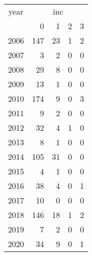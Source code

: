 \footnotesize\begin{tabular}[t]{lrrrr}
\toprule
\multicolumn{1}{c}{year} & \multicolumn{4}{c}{inc} \\
\cmidrule(l{3pt}r{3pt}){1-1} \cmidrule(l{3pt}r{3pt}){2-5}
  & 0 & 1 & 2 & 3\\
\midrule
2006 & 147 & 23 & 1 & 2\\
2007 & 3 & 2 & 0 & 0\\
2008 & 29 & 8 & 0 & 0\\
2009 & 13 & 1 & 0 & 0\\
2010 & 174 & 9 & 0 & 3\\
2011 & 9 & 2 & 0 & 0\\
2012 & 32 & 4 & 1 & 0\\
2013 & 8 & 1 & 0 & 0\\
2014 & 105 & 31 & 0 & 0\\
2015 & 4 & 1 & 0 & 0\\
2016 & 38 & 4 & 0 & 1\\
2017 & 10 & 0 & 0 & 0\\
2018 & 146 & 18 & 1 & 2\\
2019 & 7 & 2 & 0 & 0\\
2020 & 34 & 9 & 0 & 1\\
\bottomrule
\end{tabular}
